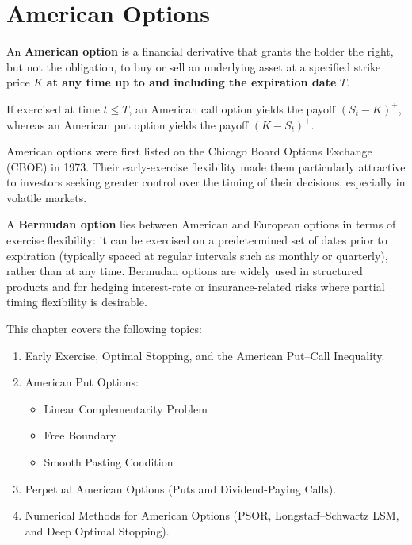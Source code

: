 \chapter{American Options}\label{ch:american-options}

\begin{definition}\label{def:american-option}
    An \textbf{American option} is a financial derivative that grants the holder the right, but not the obligation, to buy or sell an underlying asset at a specified strike price $K$ \textbf{at any time up to and including the expiration date} $T$.
\end{definition}

If exercised at time $t \le T$, an American call option yields the payoff $(S_t - K)^+$, whereas an American put option yields the payoff $(K - S_t)^+$.

American options were first listed on the Chicago Board Options Exchange (CBOE) in 1973. Their early-exercise flexibility made them particularly attractive to investors seeking greater control over the timing of their decisions, especially in volatile markets.

A \textbf{Bermudan option} lies between American and European options in terms of exercise flexibility: it can be exercised on a predetermined set of dates prior to expiration (typically spaced at regular intervals such as monthly or quarterly), rather than at any time. Bermudan options are widely used in structured products and for hedging interest-rate or insurance-related risks where partial timing flexibility is desirable.

This chapter covers the following topics:
\begin{enumerate}
    \item Early Exercise, Optimal Stopping, and the American Put--Call Inequality.
    \item American Put Options:
    \begin{itemize}
        \item Linear Complementarity Problem
        \item Free Boundary
        \item Smooth Pasting Condition
    \end{itemize}
    \item Perpetual American Options (Puts and Dividend-Paying Calls).
    \item Numerical Methods for American Options (PSOR, Longstaff--Schwartz LSM, and Deep Optimal Stopping).
\end{enumerate}


